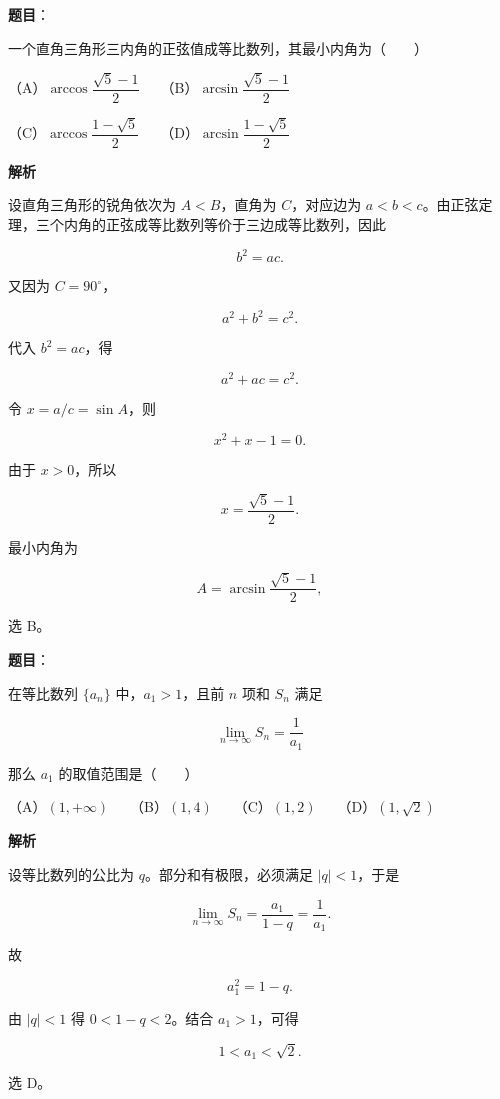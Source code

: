 \begin{answer}

\textbf{题目}：

一个直角三角形三内角的正弦值成等比数列，其最小内角为\mbox{（　　）}

（A）$\arccos\dfrac{\sqrt5-1}{2}$　　（B）$\arcsin\dfrac{\sqrt5-1}{2}$

（C）$\arccos\dfrac{1-\sqrt5}{2}$　　（D）$\arcsin\dfrac{1-\sqrt5}{2}$

\textbf{解析}

设直角三角形的锐角依次为 $A<B$，直角为 $C$，对应边为 $a<b<c$。由正弦定理，三个内角的正弦成等比数列等价于三边成等比数列，因此

\nopagebreak[4]
\[
b^2=ac.
\]

又因为 $C=90^\circ$，

\nopagebreak[4]
\[
a^2+b^2=c^2.
\]

代入 $b^2=ac$，得

\nopagebreak[4]
\[
a^2+ac=c^2.
\]

令 $x=a/c=\sin A$，则

\nopagebreak[4]
\[
x^2+x-1=0.
\]

由于 $x>0$，所以

\nopagebreak[4]
\[
x=\frac{\sqrt5-1}{2}.
\]

最小内角为

\nopagebreak[4]
\[
A=\arcsin\frac{\sqrt5-1}{2},
\]

选 B。


\end{answer}
\begin{answer}

\textbf{题目}：

在等比数列 $\{a_n\}$ 中，$a_1>1$，且前 $n$ 项和 $S_n$ 满足

\nopagebreak[4]
\[
\lim_{n\to\infty}S_n=\frac1{a_1}
\]

那么 $a_1$ 的取值范围是\mbox{（　　）}

（A）$(1,+\infty)$　　（B）$(1,4)$　　（C）$(1,2)$　　（D）$(1,\sqrt2)$

\textbf{解析}

设等比数列的公比为 $q$。部分和有极限，必须满足 $|q|<1$，于是

\nopagebreak[4]
\[
\lim_{n\to\infty}S_n=\frac{a_1}{1-q}=\frac1{a_1}.
\]

故

\nopagebreak[4]
\[
a_1^2=1-q.
\]

由 $|q|<1$ 得 $0<1-q<2$。结合 $a_1>1$，可得

\nopagebreak[4]
\[
1<a_1<\sqrt2.
\]

选 D。


\end{answer}
